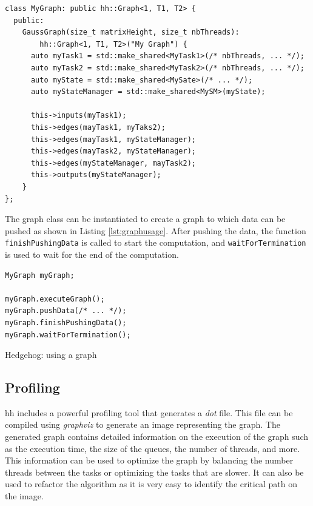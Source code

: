 \begin{listing}[ht!]
\begin{verbatim}
class MyGraph: public hh::Graph<1, T1, T2> {
  public:
    GaussGraph(size_t matrixHeight, size_t nbThreads):
        hh::Graph<1, T1, T2>("My Graph") {
      auto myTask1 = std::make_shared<MyTask1>(/* nbThreads, ... */);
      auto myTask2 = std::make_shared<MyTask2>(/* nbThreads, ... */);
      auto myState = std::make_shared<MySate>(/* ... */);
      auto myStateManager = std::make_shared<MySM>(myState);

      this->inputs(myTask1);
      this->edges(mayTask1, myTaks2);
      this->edges(mayTask1, myStateManager);
      this->edges(mayTask2, myStateManager);
      this->edges(myStateManager, mayTask2);
      this->outputs(myStateManager);
    }
};
\end{verbatim}
\label{lst:graph}
\end{listing}

The graph class can be instantiated to create a graph to which data can be
pushed as shown in Listing \ref{lst:graphusage}. After pushing the data, the
function \texttt{finishPushingData} is called to start the computation, and
\texttt{waitForTermination} is used to wait for the end of the computation.

\begin{listing}[ht!]
\begin{verbatim}
MyGraph myGraph;

myGraph.executeGraph();
myGraph.pushData(/* ... */);
myGraph.finishPushingData();
myGraph.waitForTermination();
\end{verbatim}
\caption{Hedgehog: using a graph}
\label{lst:graphusage}
\end{listing}

\subsection{Profiling}

\gls{hh} includes a powerful profiling tool that generates a \textit{dot} file.
This file can be compiled using \textit{graphviz} \cite{graphviz} to generate an
image representing the graph. The generated graph contains detailed information
on the execution of the graph such as the execution time, the size of the
queues, the number of threads, and more. This information can be used to
optimize the graph by balancing the number threads between the tasks or
optimizing the tasks that are slower. It can also be used to refactor the
algorithm as it is very easy to identify the critical path on the image.

